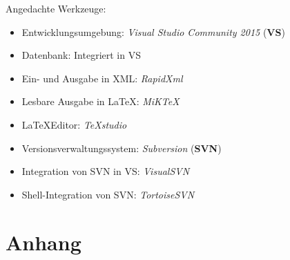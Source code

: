\documentclass[english,ngerman,parskip=half,headsepline,footsepline]{scrreprt}
\begin{document}
	Angedachte Werkzeuge:
	\begin{itemize}
		\item \label{Werkzeug:VSC} Entwicklungsumgebung: \emph{Visual Studio Community 2015} (\textbf{VS})
		\item \label{Werkzeug:VSCDB} Datenbank: Integriert in VS
		\item \label{Werkzeug:RapidXml} Ein- und Ausgabe in XML: \emph{RapidXml}
		\item \label{Werkzeug:MiKTeX} Lesbare Ausgabe in \LaTeX: \emph{MiK\TeX}
		\item \label{Werkzeug:TeXstudio} \LaTeX Editor: \emph{\TeX studio}
		\item \label{Werkzeug:Subversion} Versionsverwaltungssystem: \emph{Subversion} (\textbf{SVN})
		\item \label{Werkzeug:VisualSVN} Integration von SVN in VS: \emph{VisualSVN}
		\item \label{Werkzeug:TortoiseSVN} Shell-Integration von SVN: \emph{TortoiseSVN}
	\end{itemize}
	
	
	\appendix
	
	\chapter{Anhang}
	\thispagestyle{scrheadings}
	
\end{document}
